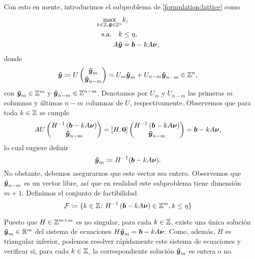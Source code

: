 Con esto en mente, introducimos el subproblema de \eqref{formulation:lattice} como
\begin{subequations}
	\label{subformulation:lattice}
	\begin{align}
		\max_{k \in \mathbb{Z}, \boldsymbol{\tilde{y}} \in \mathbb{Z}^n}
			& k, \\
		\text{s.a.} \quad
		k &\leq \eta, \\
			A\boldsymbol{\tilde{y}} &= \boldsymbol{b} - kA\boldsymbol{\nu},
	\end{align}
\end{subequations}
donde 
\begin{equation}
	\label{eq:tvecy}
	\boldsymbol{\tilde{y}} \coloneq U \begin{pmatrix} \boldsymbol{\tilde{y}}_m \\ \boldsymbol{\tilde{y}}_{n-m} \end{pmatrix}
	= U_m\boldsymbol{\tilde{y}}_m + U_{n-m}\boldsymbol{\tilde{y}}_{n-m} \in \mathbb{Z}^n,
\end{equation}
con $\boldsymbol{\tilde{y}}_m \in \mathbb{Z}^m$ y $\boldsymbol{\tilde{y}}_{n-m} \in \mathbb{Z}^{n-m}$. Denotamos por $U_m$ y
$U_{n-m}$ las primeras $m$ columnas y últimas $n - m$ columnas de $U$, respectivamente.
Observemos que para toda $k \in \mathbb{Z}$ se cumple
\begin{equation}
	AU \begin{pmatrix} H^{-1}\left(\boldsymbol{b} - kA\boldsymbol{\nu}\right) \\ \boldsymbol{\tilde{y}}_{n-m} \end{pmatrix}
	=
	[H, \boldsymbol{0}] \begin{pmatrix} H^{-1}\left(\boldsymbol{b} - kA\boldsymbol{\nu}\right) \\ \boldsymbol{\tilde{y}}_{n-m} \end{pmatrix}
	= \boldsymbol{b} - kA\boldsymbol{\nu},
\end{equation}
lo cual sugiere definir
\begin{equation}
	\label{eq:ym}
	\boldsymbol{\tilde{y}}_m \coloneq H^{-1}(\boldsymbol{b} - kA\boldsymbol{\nu}).
\end{equation}
No obstante, debemos asegurarnos que este vector sea entero. Observemos que $\boldsymbol{\tilde{y}}_{n-m}$ es un
vector libre, así que en realidad este subproblema tiene dimensión $m + 1$. Definimos el conjunto de
factibilidad
\begin{equation}
	\label{eq:feas-set}
	\mathcal{F} \coloneq \lbrace 
		k \in \mathbb{Z} \colon H^{-1}\left(\boldsymbol{b} - kA\boldsymbol{\nu}\right) \in \mathbb{Z}^m, k \leq \eta
	 \rbrace
\end{equation}

Puesto que $H \in \mathbb{Z}^{m \times m}$ es no singular, para cada $k \in \mathbb{Z}$, existe una única solución
$\boldsymbol{\tilde{y}}_m \in \mathbb{R}^m$ del sistema de ecuaciones $H\boldsymbol{\tilde{y}}_m = \boldsymbol{b} - kA\boldsymbol{\nu}$. Como, además, $H$
es triangular inferior, podemos resolver rápidamente este sistema de ecuaciones y verificar si, para
cada $k \in \mathbb{Z}$, la correspondiente solución $\boldsymbol{\tilde{y}}_m$ es entera o no.

